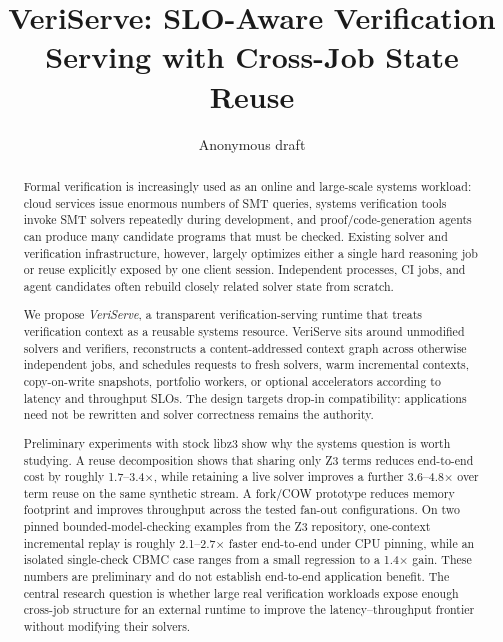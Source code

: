 \documentclass[10pt,twocolumn]{article}
\title{\textbf{VeriServe: SLO-Aware Verification Serving with Cross-Job State Reuse}}
\author{Anonymous draft}
\date{}
\begin{document}
\maketitle

\begin{abstract}
Formal verification is increasingly used as an online and large-scale systems workload: cloud services issue enormous numbers of SMT queries, systems verification tools invoke SMT solvers repeatedly during development, and proof/code-generation agents can produce many candidate programs that must be checked. Existing solver and verification infrastructure, however, largely optimizes either a single hard reasoning job or reuse explicitly exposed by one client session. Independent processes, CI jobs, and agent candidates often rebuild closely related solver state from scratch.

We propose \emph{VeriServe}, a transparent verification-serving runtime that treats verification context as a reusable systems resource. VeriServe sits around unmodified solvers and verifiers, reconstructs a content-addressed context graph across otherwise independent jobs, and schedules requests to fresh solvers, warm incremental contexts, copy-on-write snapshots, portfolio workers, or optional accelerators according to latency and throughput SLOs. The design targets drop-in compatibility: applications need not be rewritten and solver correctness remains the authority.

Preliminary experiments with stock libz3 show why the systems question is worth studying. A reuse decomposition shows that sharing only Z3 terms reduces end-to-end cost by roughly 1.7--3.4$\times$, while retaining a live solver improves a further 3.6--4.8$\times$ over term reuse on the same synthetic stream. A fork/COW prototype reduces memory footprint and improves throughput across the tested fan-out configurations. On two pinned bounded-model-checking examples from the Z3 repository, one-context incremental replay is roughly 2.1--2.7$\times$ faster end-to-end under CPU pinning, while an isolated single-check CBMC case ranges from a small regression to a 1.4$\times$ gain. These numbers are preliminary and do not establish end-to-end application benefit. The central research question is whether large real verification workloads expose enough cross-job structure for an external runtime to improve the latency--throughput frontier without modifying their solvers.
\end{abstract}
\end{document}
